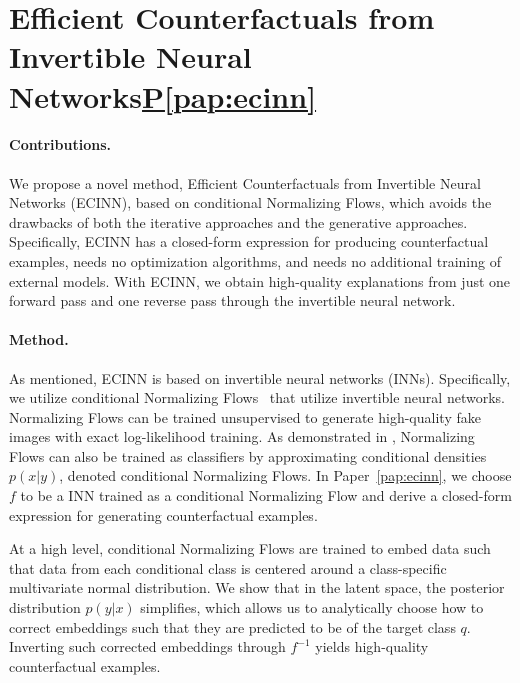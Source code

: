 \documentclass[11pt,a4paper,twoside,openright,final]{memoir}
\newcommand\contribution[1]{\hspace{0.5em}\hyperref[#1]{P\ref{#1}}}
\newcommand*{\paperref}[1]{Paper~\hyperref[#1]{\ref{#1}}}
\begin{document}
\section[Efficient Counterfactuals from INNs]{Efficient Counterfactuals from Invertible Neural Networks\contribution{pap:ecinn}}\label{sec:ecinn}
\paragraph{Contributions.}
We propose a novel method, Efficient Counterfactuals from Invertible Neural Networks (ECINN), based on conditional Normalizing Flows, which avoids the drawbacks of both the iterative approaches and the generative approaches.
Specifically, ECINN has a closed-form expression for producing counterfactual examples, needs no optimization algorithms, and needs no additional training of external models. 
With ECINN, we obtain high-quality explanations from just one forward pass and one reverse pass through the invertible neural network.

\paragraph{Method.}
As mentioned, ECINN is based on invertible neural networks (INNs).
Specifically, we utilize conditional Normalizing Flows~\cite{realnvp, nice, glow} that utilize invertible neural networks.
Normalizing Flows can be trained unsupervised to generate high-quality fake images with exact log-likelihood training.
As demonstrated in \cite{ibinn}, Normalizing Flows can also be trained as classifiers by approximating conditional densities $p(x | y)$, denoted conditional Normalizing Flows.  
In \paperref{pap:ecinn}, we choose $f$ to be a INN trained as a conditional Normalizing Flow and derive a closed-form expression for generating counterfactual examples. 

At a high level, conditional Normalizing Flows are trained to embed data such that data from each conditional class is centered around a class-specific multivariate normal distribution. 
We show that in the latent space, the posterior distribution $p(y|x)$ simplifies, which allows us to analytically choose how to correct embeddings such that they are predicted to be of the target class $q$. 
Inverting such corrected embeddings through $f^{-1}$ yields high-quality counterfactual examples. 
\end{document}

